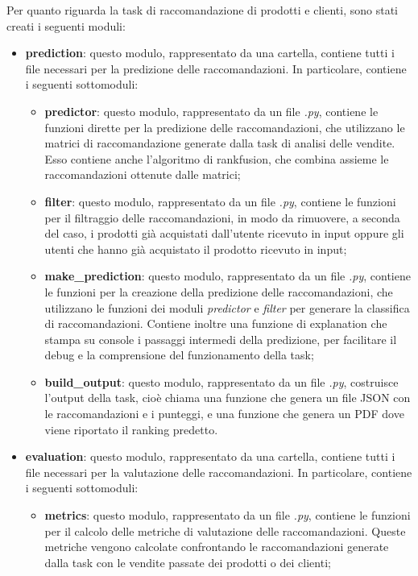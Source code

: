 Per quanto riguarda la task di raccomandazione di prodotti e clienti, sono stati creati i seguenti moduli:
\begin{itemize}
    \item \textbf{prediction}: questo modulo, rappresentato da una cartella, contiene tutti i file necessari per la predizione delle raccomandazioni. In particolare, contiene i seguenti sottomoduli:
    \begin{itemize}
        \item \textbf{predictor}: questo modulo, rappresentato da un file \emph{.py}, contiene le funzioni dirette per la predizione delle raccomandazioni, che utilizzano le matrici di raccomandazione generate dalla task di analisi delle vendite. Esso contiene anche l'algoritmo di \gls{rankfusion}, che combina assieme le raccomandazioni ottenute dalle matrici;
        \item \textbf{filter}: questo modulo, rappresentato da un file \emph{.py}, contiene le funzioni per il filtraggio delle raccomandazioni, in modo da rimuovere, a seconda del caso, i prodotti già acquistati dall'utente ricevuto in input oppure gli utenti che hanno già acquistato il prodotto ricevuto in input;
        \item \textbf{make\_prediction}: questo modulo, rappresentato da un file \emph{.py}, contiene le funzioni per la creazione della predizione delle raccomandazioni, che utilizzano le funzioni dei moduli \emph{predictor} e \emph{filter} per generare la classifica di raccomandazioni. Contiene inoltre una funzione di explanation che stampa su console i passaggi intermedi della predizione, per facilitare il debug e la comprensione del funzionamento della task;
        \item \textbf{build\_output}: questo modulo, rappresentato da un file \emph{.py}, costruisce l'output della task, cioè chiama una funzione che genera un file JSON con le raccomandazioni e i punteggi, e una funzione che genera un PDF dove viene riportato il ranking predetto.
    \end{itemize}
    \item \textbf{evaluation}: questo modulo, rappresentato da una cartella, contiene tutti i file necessari per la valutazione delle raccomandazioni. In particolare, contiene i seguenti sottomoduli:
    \begin{itemize}
        \item \textbf{metrics}: questo modulo, rappresentato da un file \emph{.py}, contiene le funzioni per il calcolo delle metriche di valutazione delle raccomandazioni. Queste metriche vengono calcolate confrontando le raccomandazioni generate dalla task con le vendite passate dei prodotti o dei clienti;

\end{itemize}
\end{itemize}
